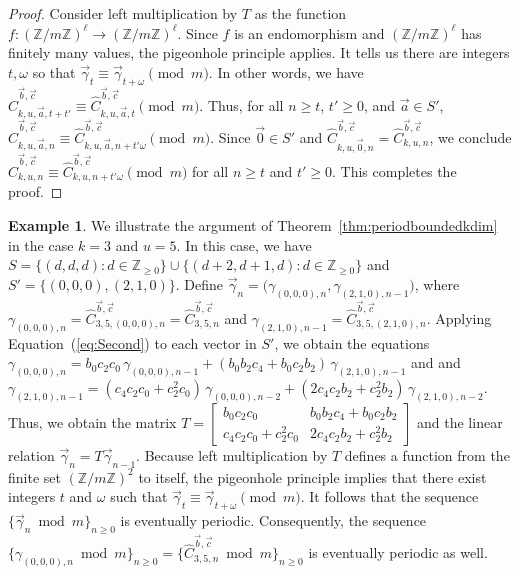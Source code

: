\documentclass[11pt]{article}
\theoremstyle{remark}
\theoremstyle{definition}
\newtheorem{example}[theorem]{Example}
\begin{document}
\begin{proof}
Consider left multiplication by $T$ as the function $f:(\mathbb{Z}/m\mathbb{Z})^{\ell} \to (\mathbb{Z}/m\mathbb{Z})^{\ell}$. Since $f$ is an endomorphism and $(\mathbb{Z}/m\mathbb{Z})^{\ell}$ has finitely many values, the pigeonhole principle applies. It tells us there are integers $t, \omega$ so that $\vec{\gamma}_t \equiv  \vec{\gamma}_{t+\omega} \pmod{m}$. In other words, we have $\widehat{C}_{k, u,\vec{a}, t+t'}^{\vec{b}, \vec{c}} \equiv \widehat{C}_{k, u,\vec{a}, t}^{\vec{b}, \vec{c}} \pmod{m}$. Thus, for all $n \geq t$, $t' \geq 0$, and $\vec{a} \in S'$, $\widehat{C}_{k, u,\vec{a}, n}^{\vec{b}, \vec{c}} \equiv \widehat{C}_{k, u,\vec{a}, n+t'\omega}^{\vec{b}, \vec{c}} \pmod{m}$. Since $\vec{0} \in S'$ and $\widehat{C}_{k, u, \vec{0},n}^{\vec{b}, \vec{c}} = \widehat{C}_{k, u, n}^{\vec{b}, \vec{c}}$, we conclude $\widehat{C}_{k, u, n}^{\vec{b}, \vec{c}} \equiv \widehat{C}_{k, u, n+t'\omega}^{\vec{b}, \vec{c}} \pmod{m}$ for all $n \geq t$ and $t' \geq 0$. This completes the proof.
\end{proof}
    \begin{example}
We illustrate the argument of Theorem~\ref{thm:periodboundedkdim} in the case \(k=3\) and \(u=5\). In this case, we have $
S=\{(d,d,d): d\in\mathbb{Z}_{\geq 0}\}\cup\{(d+2,d+1,d): d\in\mathbb{Z}_{\geq 0}\}$
and $S'=\{(0,0,0),(2,1,0)\}$. Define $
\vec{\gamma}_n=\bigl(\gamma_{(0,0,0),n},\gamma_{(2,1,0),n-1}\bigr)$, where $\gamma_{(0,0,0),n} = \widehat{C}_{3,5,(0,0,0),n}^{\vec b,\vec c} = \widehat{C}_{3,5,n}^{\vec b,\vec c}$
and $\gamma_{(2,1,0),n-1} =\widehat{C}_{3,5,(2,1,0),n}^{\vec b,\vec c}$. Applying Equation~(\ref{eq:Second}) to each vector in \(S'\), we obtain the equations
$
\gamma_{(0,0,0),n}
= b_0c_2c_0\,\gamma_{(0,0,0),n-1} +(b_0b_2c_4+b_0c_2b_2)\,\gamma_{(2,1,0),n-1}$ and 
and $\gamma_{(2,1,0),n-1} =(c_4c_2c_0+c_2^2c_0)\,\gamma_{(0,0,0),n-2} +
(2c_4c_2b_2+c_2^2b_2)\,\gamma_{(2,1,0),n-2}$. Thus, we obtain the matrix $T= \begin{bmatrix}
b_0c_2c_0 & b_0b_2c_4+b_0c_2b_2 \\
c_4c_2c_0+c_2^2c_0 & 2c_4c_2b_2+c_2^2b_2
\end{bmatrix}$ and the linear relation $\vec{\gamma}_n=T\vec{\gamma}_{n-1}$.
Because left multiplication by \(T\) defines a function from the finite set \((\mathbb{Z}/m\mathbb{Z})^2\) to itself, the pigeonhole principle implies that there exist integers \(t\) and \(\omega\) such that $\vec{\gamma}_t\equiv \vec{\gamma}_{t+\omega}\pmod{m}$. It follows that the sequence \(\{\vec{\gamma}_n \bmod m\}_{n\geq 0}\) is eventually periodic. Consequently, the sequence $\{\gamma_{(0,0,0),n}\bmod m\}_{n\geq 0} = \{\widehat{C}_{3,5,n}^{\vec b,\vec c}\bmod m\}_{n\geq 0}$ is eventually periodic as well.
\end{example}
\end{document}
